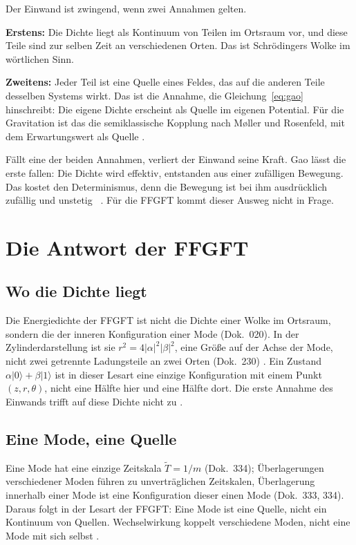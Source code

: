 Der Einwand ist zwingend, wenn zwei Annahmen gelten.

\textbf{Erstens:} Die Dichte liegt als Kontinuum von Teilen im Ortsraum vor, und diese Teile sind zur
selben Zeit an verschiedenen Orten. Das ist Schrödingers Wolke im wörtlichen Sinn.

\textbf{Zweitens:} Jeder Teil ist eine Quelle eines Feldes, das auf die anderen Teile desselben
Systems wirkt. Das ist die Annahme, die Gleichung~\eqref{eq:gao} hinschreibt: Die eigene Dichte
erscheint als Quelle im eigenen Potential. Für die Gravitation ist das die semiklassische Kopplung
nach Møller und Rosenfeld, mit dem Erwartungswert als Quelle \EM.

Fällt eine der beiden Annahmen, verliert der Einwand seine Kraft. Gao lässt die erste fallen: Die
Dichte wird effektiv, entstanden aus einer zufälligen Bewegung. Das kostet den Determinismus, denn
die Bewegung ist bei ihm ausdrücklich zufällig und unstetig \QM~\cite{Gao2011}. Für die FFGFT kommt
dieser Ausweg nicht in Frage.

\section{Die Antwort der FFGFT}

\subsection{Wo die Dichte liegt}

Die Energiedichte der FFGFT ist nicht die Dichte einer Wolke im Ortsraum, sondern die der inneren
Konfiguration einer Mode (Dok.~020). In der Zylinderdarstellung ist sie $r^2=4|\alpha|^2|\beta|^2$,
eine Größe auf der Achse der Mode, nicht zwei getrennte Ladungsteile an zwei Orten (Dok.~230) \BM.
Ein Zustand $\alpha|0\rangle+\beta|1\rangle$ ist in dieser Lesart eine einzige Konfiguration mit
einem Punkt $(z,r,\theta)$, nicht eine Hälfte hier und eine Hälfte dort. Die erste Annahme des
Einwands trifft auf diese Dichte nicht zu \SM.

\subsection{Eine Mode, eine Quelle}

Eine Mode hat eine einzige Zeitskala $\tilde T=1/m$ (Dok.~334); Überlagerungen verschiedener Moden
führen zu unverträglichen Zeitskalen, Überlagerung innerhalb einer Mode ist eine Konfiguration dieser
einen Mode (Dok.~333, 334). Daraus folgt in der Lesart der FFGFT: Eine Mode ist eine Quelle, nicht
ein Kontinuum von Quellen. Wechselwirkung koppelt verschiedene Moden, nicht eine Mode mit sich
selbst \SM.

